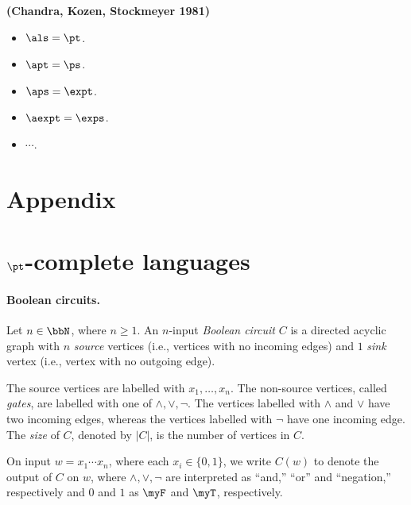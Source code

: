 \documentclass[11pt, a4paper]{article}
\begin{document}
\begin{theorem}
\label{theo:alternation}
{\bf (Chandra, Kozen, Stockmeyer 1981)}
\begin{itemize}
\item 
$\als=\pt$.
\item
$\apt=\ps$.
\item
$\aps=\expt$.
\item
$\aexpt=\exps$.
\item
$\cdots$.
\end{itemize}
\end{theorem}






\appendix

\section*{Appendix}

\section{$\pt$-complete languages}

\paragraph*{Boolean circuits.}
Let $n\in \bbN$, where $n\geq 1$.
An $n$-input {\em Boolean circuit} $C$ is a directed acyclic graph with
$n$ {\em source} vertices (i.e., vertices with no incoming edges) and 
$1$ {\em sink} vertex (i.e., vertex with no outgoing edge).

The source vertices are labelled with $x_1,\ldots,x_n$.
The non-source vertices, called {\em gates},
are labelled with one of $\wedge, \vee,\neg$.
The vertices labelled with $\wedge$ and $\vee$ have two incoming edges,
whereas the vertices labelled with $\neg$ have one incoming edge.
The {\em size} of $C$, denoted by $|C|$, is the number of vertices in $C$.

On input $w = x_1\cdots x_n$, where each $x_i \in \{0,1\}$,
we write $C(w)$ to denote the output of $C$ on $w$,
where $\wedge,\vee,\neg$ are interpreted as ``and,'' ``or'' and ``negation,'' respectively
and $0$ and $1$ as $\myF$ and $\myT$, respectively.
\end{document}
